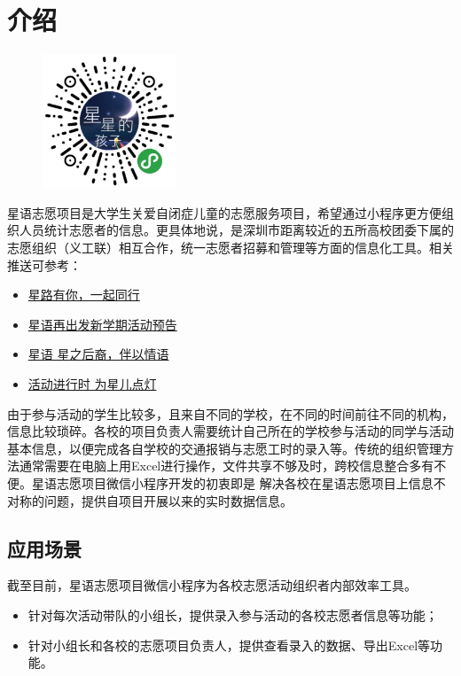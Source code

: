 \documentclass[]{ctexart}
\date{}
\begin{document}
\section{介绍}\label{ux4ecbux7ecd}
\begin{figure}
\centering
\includegraphics[width=4cm]{qr_code.jpg}
\end{figure}
星语志愿项目是大学生关爱自闭症儿童的志愿服务项目，希望通过小程序更方便组织人员统计志愿者的信息。更具体地说，是深圳市距离较近的五所高校团委下属的志愿组织（义工联）相互合作，统一志愿者招募和管理等方面的信息化工具。相关推送可参考：

\begin{itemize}
\item
  \href{https://mp.weixin.qq.com/s/byIknsUz62tn1YJlp10byQ}{星路有你，一起同行}
\item
  \href{https://mp.weixin.qq.com/s/hSAWZha7Tkq2MzG_uOD06Q}{星语再出发\textbar{}新学期活动预告}
\item
  \href{https://mp.weixin.qq.com/s/VM50R464I1mo3E6GOoEZew}{星语
  \textbar{} 星之后裔，伴以情语}
\item
  \href{https://mp.weixin.qq.com/s/RyINo_CrGJZAUaHekhHcPg}{活动进行时
  \textbar{} 为星儿点灯}
\end{itemize}

由于参与活动的学生比较多，且来自不同的学校，在不同的时间前往不同的机构，信息比较琐碎。各校的项目负责人需要统计自己所在的学校参与活动的同学与活动基本信息，以便完成各自学校的交通报销与志愿工时的录入等。传统的组织管理方法通常需要在电脑上用Excel进行操作，文件共享不够及时，跨校信息整合多有不便。星语志愿项目微信小程序开发的初衷即是
解决各校在星语志愿项目上信息不对称的问题，提供自项目开展以来的实时数据信息。

\subsection{应用场景}\label{ux5e94ux7528ux573aux666f}

截至目前，星语志愿项目微信小程序为各校志愿活动组织者内部效率工具。

\begin{itemize}
\item
  针对每次活动带队的小组长，提供录入参与活动的各校志愿者信息等功能；
\item
  针对小组长和各校的志愿项目负责人，提供查看录入的数据、导出Excel等功能。
\end{itemize}
\end{document}

